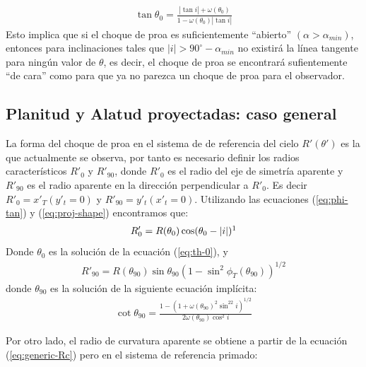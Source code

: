 \begin{align}
  \tan\theta_0 = \frac{|\tan i| + \omega(\theta_0)}{1 - \omega(\theta_0)|\tan i|}
  \label{eq:th-0}
\end{align}
Esto implica que si el choque de proa es suficientemente ``abierto'' $(\alpha > \alpha_{min})$, entonces para inclinaciones tales que
$|i| > 90^\circ - \alpha_{min}$ no existirá la línea tangente para ningún valor de $\theta$, es decir, el choque de proa se encontrará sufientemente ``de cara'' como para que ya no parezca un choque de proa para el observador.

\subsection{Planitud y Alatud proyectadas: caso general}

La forma del choque de proa en el sistema de de referencia del cielo $R'(\theta')$ es la que actualmente se observa, por tanto
es necesario definir los radios característicos $R'_0$ y $R'_{90}$, donde $R'_0$ es el radio del eje de simetría aparente y $R'_{90}$ es el radio aparente en la dirección perpendicular a $R'_0$. Es decir $R'_0 = x'_T(y'_t=0)$ y $R'_{90} = y'_t(x'_t = 0)$. Utilizando las ecuaciones (\ref{eq:phi-tan}) y (\ref{eq:proj-shape}) encontramos que:
\begin{align}
R'_0 = R(\theta_0)\cos(\theta_0 - |i|)\footnotemark
\label{eq:R0p}
\end{align}
Donde $\theta_0$ es la solución de la ecuación (\ref{eq:th-0}), y
\begin{align}
  R'_{90} = R(\theta_{90})\sin\theta_{90}\left(1-\sin^2\phi_T(\theta_{90})\right)^{1/2}
  \label{eq:R90p}
\end{align}
donde $\theta_{90}$ es la solución de la siguiente ecuación implícita:
\begin{align}
  \cot\theta_{90} = \frac{1 - \left(1+\omega(\theta_{90})^2\sin^22i\right)^{1/2}}
  {2\omega(\theta_{90})\cos^2i}
  \label{eq:th90}
\end{align}

Por otro lado, el radio de curvatura aparente se obtiene a partir de la ecuación (\ref{eq:generic-Rc}) pero en el sistema de referencia primado:

